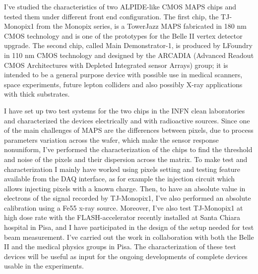 \documentclass[a4paper]{report}
\begin{document}
I've studied the characteristics of two ALPIDE-like CMOS MAPS chips and tested them under different front end configuration. The first chip, the TJ-Monopix1 from the Monopix series, is a TowerJazz MAPS fabricated in 180 nm CMOS technology and is one of the prototypes for the Belle II vertex detector upgrade. The second chip, called Main Demonstrator-1, is produced by LFoundry in 110 nm CMOS technology and designed by the ARCADIA (Advanced Readout CMOS Architectures with Depleted Integrated sensor Arrays) group; it is intended to be a general purpose device with possible use in medical scanners, space experiments, future lepton colliders and also possibly X-ray applications with thick substrates.  

I have set up two test systems for the two chips in the INFN clean laboratories and characterized the devices electrically and with radioactive sources. Since one of the main challenges of MAPS are the differences between pixels, due to process parameters variation across the wafer, which make the sensor response nonuniform, I've performed the characterization of the chips to find the threshold and noise of the pixels and their dispersion across the matrix. To make test and characterization I mainly have worked using pixels setting and testing feature available from the DAQ interface, as for example the injection circuit which allows injecting pixels with a known charge. Then, to have an absolute value in electrons of the signal recorded by TJ-Monopix1, I've also performed an absolute calibration using a Fe55 x-ray source. 
Moreover, I've also test TJ-Monopix1 at high dose rate with the FLASH-accelerator recently installed at Santa Chiara hospital in Pisa, and I have participated in the design of the setup needed for test beam measurement.
I've carried out the work in collaboration with both the Belle II and the medical physics groups in Pisa.
The characterization of these test devices will be useful as input for the ongoing developments of complete devices usable in the experiments.
\end{document}
